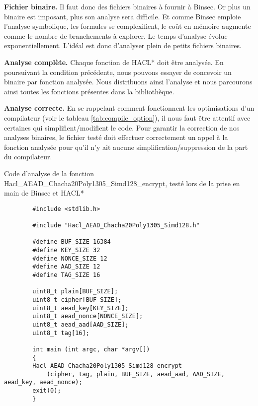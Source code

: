 \textbf{Fichier binaire.} Il faut donc des fichiers binaires à fournir à Binsec. Or plus un binaire est imposant, plus son analyse sera difficile. Et comme Binsec emploie l'analyse symbolique, les formules se complexifient, le coût en mémoire augmente comme le nombre de branchements à explorer. Le temps d'analyse évolue exponentiellement. L'idéal est donc d'analyser plein de petits fichiers binaires.\smallbreak

\textbf{Analyse complète.} Chaque fonction de HACL* doit être analysée. En poursuivant la condition précédente, nous pouvons essayer de concevoir un binaire par fonction analysée. Nous distribuons ainsi l'analyse et nous parcourons ainsi toutes les fonctions présentes dans la bibliothèque.\medbreak

\textbf{Analyse correcte.} En se rappelant comment fonctionnent les optimisations d'un compilateur (voir le tableau \ref{tab:compile_option}), il nous faut être attentif avec certaines qui simplifient/modifient le code. Pour garantir la correction de nos analyses binaires, le fichier testé doit effectuer correctement un appel à la fonction analysée pour qu'il n'y ait aucune simplification/suppression de la part du compilateur.

\begin{listing}[!ht]
    \caption{Code d'analyse de la fonction Hacl\_AEAD\_Chacha20Poly1305\_Simd128\-\_encrypt, testé lors de la prise en main de Binsec et HACL*}
    \label{lst:prise_en_main}
    \begin{verbatim}
        #include <stdlib.h>

        #include "Hacl_AEAD_Chacha20Poly1305_Simd128.h"

        #define BUF_SIZE 16384
        #define KEY_SIZE 32
        #define NONCE_SIZE 12
        #define AAD_SIZE 12
        #define TAG_SIZE 16

        uint8_t plain[BUF_SIZE];
        uint8_t cipher[BUF_SIZE];
        uint8_t aead_key[KEY_SIZE];
        uint8_t aead_nonce[NONCE_SIZE];
        uint8_t aead_aad[AAD_SIZE];
        uint8_t tag[16];

        int main (int argc, char *argv[])
        {
        Hacl_AEAD_Chacha20Poly1305_Simd128_encrypt
            (cipher, tag, plain, BUF_SIZE, aead_aad, AAD_SIZE, aead_key, aead_nonce);
        exit(0);
        }
    \end{verbatim}
\end{listing}

